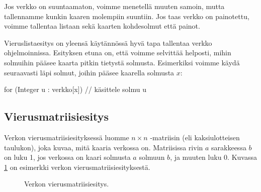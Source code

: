 Jos verkko on suuntaamaton, voimme menetellä muuten samoin,
mutta tallennamme kunkin kaaren molempiin suuntiin.
Jos taas verkko on painotettu, voimme tallentaa listaan
sekä kaarten kohdesolmut että painot.

Vieruslistaesitys on yleensä käytännössä hyvä tapa
tallentaa verkko ohjelmoinnissa.
Esityksen etuna on, että voimme selvittää helposti,
mihin solmuihin pääsee kaarta pitkin tietystä solmusta.
Esimerkiksi voimme käydä seuraavasti läpi solmut,
joihin pääsee kaarella solmusta $x$:

\begin{code}
for (Integer u : verkko[x]) {
    // käsittele solmu u
}
\end{code}

\subsection{Vierusmatriisiesitys}

Verkon vierusmatriisiesityksessä luomme $n \times n$ -matriisin
(eli kaksiulotteisen taulukon), joka kuvaa, mitä kaaria verkossa on.
Matriisissa rivin $a$ sarakkeessa $b$ on luku 1,
jos verkossa on kaari solmusta $a$ solmuun $b$,
ja muuten luku 0.
Kuvassa \ref{fig:vervil} on esimerkki verkon
vierusmatriisiesityksestä.

\begin{figure}
\center
\begin{center}
\end{center}
\caption{Verkon vierusmatriisiesitys.}
\label{fig:vervil}
\end{figure}

